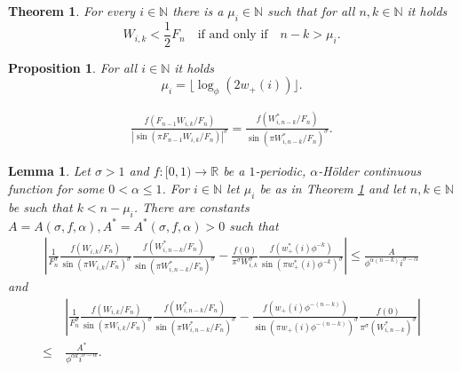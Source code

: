 \documentclass[10pt,a4paper]{amsart}
\newtheorem{thm}{Theorem}
\newtheorem{prop}{Proposition}
\newtheorem{lem}{Lemma}
\newcommand{\bbN}{\mathbb{N}}
\newcommand{\bbR}{\mathbb{R}}
\begin{document}
\begin{thm} \label{thm:const_shift}
	For every $i \in \bbN$ there is a $\mu_i \in \bbN$ such that for all $n, k \in \bbN$ it holds
	$$
	W_{i, k} < \frac12 F_n \quad \text{if and only if} \quad n-k > \mu_i.
	$$
\end{thm}

\begin{prop} \label{prop:mu_formula}
    For all $i \in \bbN$ it holds
    $$
    \mu_i = \lfloor\log_\phi(2 w_+(i))\rfloor.
    $$
\end{prop}

\begin{align} \label{eq:introduce_dual}
    \frac{f(F_{n-1} W_{i, k}/F_n)}{\left|{\sin(\pi F_{n-1} W_{i, k}/F_n)}\right|^\sigma} = \frac{f(W^*_{i, n-k}/F_n)}{{\sin(\pi W^*_{i, n-k}/F_n)}^\sigma}.
\end{align}

\begin{lem} \label{lem:approx_quality}
    Let $\sigma > 1$ and $f:[0, 1) \rightarrow \bbR$ be a $1$-periodic, $\alpha$-Hölder continuous function for some $0 < \alpha \leq 1$. For $i \in \bbN$ let $\mu_i$ be as in Theorem \ref{thm:const_shift} and let $n, k \in \bbN$ be such that $k < n - \mu_i$. There are constants $A = A(\sigma, f, \alpha), A^*=A^*(\sigma, f, \alpha) > 0$ such that
    \begin{align*}
        \left|\frac1{F_n^\sigma} \frac{f(W_{i, k}/F_n)}{{\sin(\pi W_{i, k}/F_n)}^\sigma} \frac{f(W^*_{i, n-k}/F_n)}{{\sin(\pi W^*_{i, n-k}/F_n)}^\sigma} - \frac{f(0) }{\pi^\sigma W_{i, k}^\sigma} \frac{f(w_+^*(i) \phi^{-k})}{{\sin(\pi w_+^*(i) \phi^{-k})}^\sigma}\right| \leq \frac{A}{\phi^{\alpha (n-k)} i^{\sigma - \alpha}}
    \end{align*}
    and
    \begin{align*}
        & \left|\frac1{F_n^\sigma} \frac{f(W_{i, k}/F_n)}{{\sin(\pi W_{i, k}/F_n)}^\sigma} \frac{f(W^*_{i, n-k}/F_n)}{{\sin(\pi W^*_{i, n-k}/F_n)}^\sigma}
        - \frac{f(w_+(i) \phi^{-(n-k)})}{{\sin(\pi w_+(i) \phi^{-(n-k)})}^\sigma} \frac{f(0)}{ \pi^\sigma (W_{i, n-k}^*)^\sigma}\right| \\
        \leq ~ & \frac{A^*}{\phi^{\alpha k} i^{\sigma-\alpha}}.
    \end{align*}
\end{lem}
\end{document}
